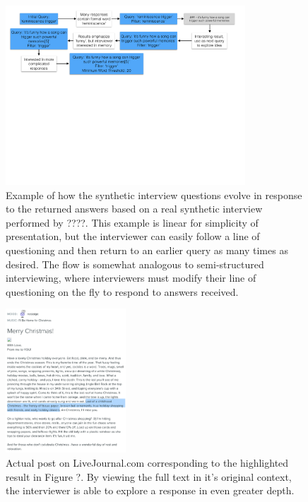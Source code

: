 \documentclass{sigchi}
\begin{document}
\begin{figure}[htb]
\centering \includegraphics[width=0.8\textwidth]{figures/InterviewFlow.pdf} 
\caption{Example of how the synthetic interview questions evolve in response to the returned answers based on a real synthetic interview performed by ????. This example is linear for simplicity of presentation, but the interviewer can easily follow a line of questioning and then return to an earlier query as many times as desired. The flow is somewhat analogous to semi-structured interviewing, where interviewers must modify their line of questioning on the fly to respond to answers received.}
\end{figure}

\begin{figure}[tb]
\centering \includegraphics[width=0.4\textwidth]{figures/examplePost2} 
\caption{Actual post on LiveJournal.com corresponding to the highlighted result in Figure ?. By viewing the full text in it's original context, the interviewer is able to explore a response in even greater depth. }
\end{figure}

\end{document}
